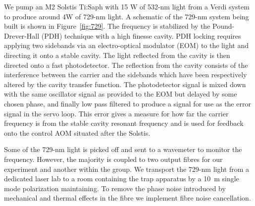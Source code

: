 \documentclass[12pt]{iopart}
\begin{document}
We pump an M2 Solstis Ti:Saph with 15 W of 532-nm light from a Verdi
system to produce around 4W of 729-nm light.  A schematic of the
729-nm system being built is shown in Figure~\ref{fig:729}. The
frequency is
stabilized by the Pound-Drever-Hall (PDH) technique with a high
finesse cavity. PDH locking requires 
applying two sidebands via an electro-optical modulator (EOM) to the light and directing it onto a stable cavity. The
light reflected from the cavity is then directed onto a fast photodetector. The reflection
from the cavity consists of the interference between the carrier and
the sidebands which have been respectively altered by the cavity
transfer function. The photodetector signal is mixed down with the
same oscillator signal as provided to the EOM but delayed by some chosen
phase, and finally low pass filtered to produce a signal for use as
the error signal in the servo loop.  This error gives a measure for
how far the carrier frequency is from the stable cavity resonant
frequency and is used for feedback onto the control AOM situated after
the Solstis.

Some of the 729-nm light is picked off and sent to a wavemeter to
monitor the frequency. However, the majority is coupled to two output
fibres for our experiment and another within the group. We transport
the 729-nm light from a dedicated laser lab to a room containing the
trap apparatus by a 10~m single mode polarization maintaining.  To
remove the phase noise introduced by mechanical and thermal effects in
the fibre we implement fibre noise cancellation.




\end{document}
